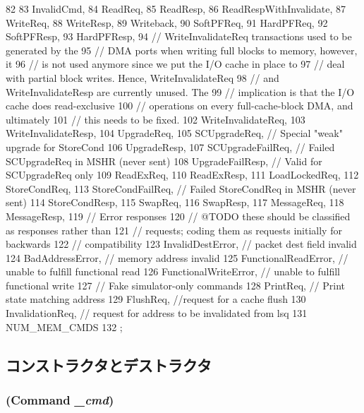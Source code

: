 \begin{DoxyCode}
82     {
83         InvalidCmd,
84         ReadReq,
85         ReadResp,
86         ReadRespWithInvalidate,
87         WriteReq,
88         WriteResp,
89         Writeback,
90         SoftPFReq,
91         HardPFReq,
92         SoftPFResp,
93         HardPFResp,
94         // WriteInvalidateReq transactions used to be generated by the
95         // DMA ports when writing full blocks to memory, however, it
96         // is not used anymore since we put the I/O cache in place to
97         // deal with partial block writes. Hence, WriteInvalidateReq
98         // and WriteInvalidateResp are currently unused. The
99         // implication is that the I/O cache does read-exclusive
100         // operations on every full-cache-block DMA, and ultimately
101         // this needs to be fixed.
102         WriteInvalidateReq,
103         WriteInvalidateResp,
104         UpgradeReq,
105         SCUpgradeReq,           // Special "weak" upgrade for StoreCond
106         UpgradeResp,
107         SCUpgradeFailReq,       // Failed SCUpgradeReq in MSHR (never sent)
108         UpgradeFailResp,        // Valid for SCUpgradeReq only
109         ReadExReq,
110         ReadExResp,
111         LoadLockedReq,
112         StoreCondReq,
113         StoreCondFailReq,       // Failed StoreCondReq in MSHR (never sent)
114         StoreCondResp,
115         SwapReq,
116         SwapResp,
117         MessageReq,
118         MessageResp,
119         // Error responses
120         // @TODO these should be classified as responses rather than
121         // requests; coding them as requests initially for backwards
122         // compatibility
123         InvalidDestError,  // packet dest field invalid
124         BadAddressError,   // memory address invalid
125         FunctionalReadError, // unable to fulfill functional read
126         FunctionalWriteError, // unable to fulfill functional write
127         // Fake simulator-only commands
128         PrintReq,       // Print state matching address
129         FlushReq,      //request for a cache flush
130         InvalidationReq,   // request for address to be invalidated from lsq
131         NUM_MEM_CMDS
132     };
\end{DoxyCode}


\subsection{コンストラクタとデストラクタ}
\hypertarget{classMemCmd_adca27b55889ccef624966f301e91939d}{
\subsubsection[{MemCmd}]{ ({\bf Command} {\em \_\-cmd})}}
\label{classMemCmd_adca27b55889ccef624966f301e91939d}



